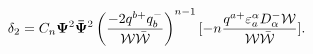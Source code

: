 \begin{equation}\label{gen_rest1}
\delta_{2}=C_{n}{\bf \Psi}^{2}{\bf \bar\Psi}^{2}\left({-2q^{b
+}q^{-}_{b}\over {\cal W}\bar{\cal W}}\right)^{n-1}[-n {q^{a
+}\varepsilon^{\alpha}_{a}D^{-}_{\alpha}{\cal W}\over {\cal
W}\bar{\cal W}}].
\end{equation}

